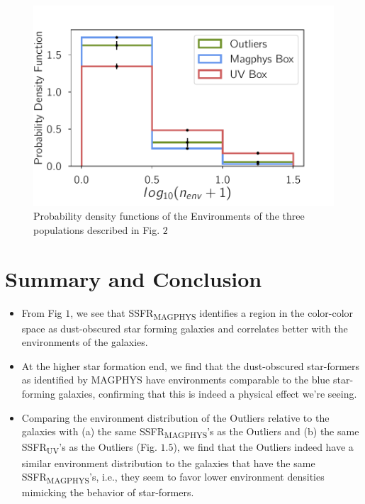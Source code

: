 \begin{figure}
\includegraphics[width=\textwidth]{figures/4_jk_plot.pdf}
\caption[Environments of the outliers compared to the other populations]
{Probability density functions of the Environments of the three populations described in Fig. $2$
\label{fig:munny_plot}}
\end{figure}

\section{Summary and Conclusion}
 \begin{itemize}
 \item{From Fig $1$, we see that SSFR\textsubscript{MAGPHYS} identifies a region in the color-color space as dust-obscured star forming galaxies and correlates better with the environments of the galaxies.}
 \item{At the higher star formation end, we find that the dust-obscured star-formers as identified by MAGPHYS have environments comparable to the blue star-forming galaxies, confirming that this is indeed a physical effect we're seeing.}
 \item{Comparing the environment distribution of the Outliers relative to the galaxies with (a) the same SSFR\textsubscript{MAGPHYS}'s as the Outliers and (b) the same SSFR\textsubscript{UV}'s as the Outliers (Fig. $1.5$), we find that the Outliers indeed have a similar environment distribution to the galaxies that have the same SSFR\textsubscript{MAGPHYS}'s, i.e., they seem to favor lower environment densities mimicking the behavior of star-formers.}
 \end{itemize}
 
 
 
 
 